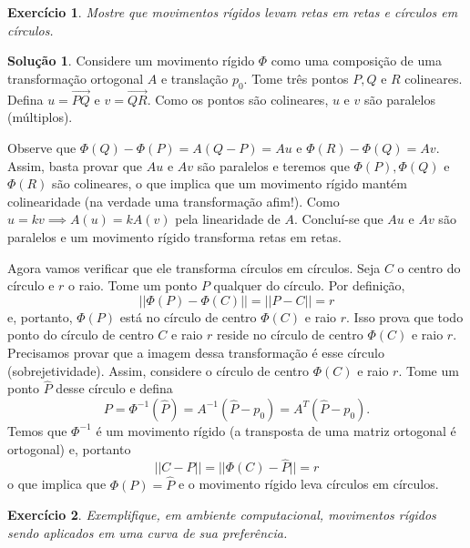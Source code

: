 \documentclass[a4paper,12pt]{article}
\theoremstyle{exer}
\newtheorem{exercise}{Exercício}
\theoremstyle{definition}
\newtheorem{solution}{Solução}
\theoremstyle{plain}
\begin{document}
\begin{exercise}
    Mostre que movimentos rígidos levam retas em retas e círculos em círculos.
\end{exercise}

\begin{solution}
    Considere um movimento rígido $\Phi$ como uma composição de uma transformação
    ortogonal $A$ e translação $p_0$. Tome três pontos $P, Q$ e $R$
    colineares. Defina $u = \vec{PQ}$ e $v = \vec{QR}$.  Como os pontos são
    colineares, $u$ e $v$ são paralelos (múltiplos). 
    
    Observe que $\Phi(Q) - \Phi(P) = A(Q - P) = Au$ e $\Phi(R) - \Phi(Q) =
    Av$. Assim, basta provar que $Au$ e $Av$ são paralelos e teremos que $\Phi(P),
    \Phi(Q)$ e $\Phi(R)$ são colineares, o que implica que um movimento rígido
    mantém colinearidade (na verdade uma transformação afim!). Como $u = kv
    \implies A(u) = kA(v)$ pela linearidade de $A$.  Concluí-se que $Au$ e
    $Av$ são paralelos e um movimento rígido transforma retas em retas. 

    \vspace{5mm}

    \noindent Agora vamos verificar que ele transforma círculos em círculos. Seja $C$ o centro do círculo e $r$ o raio. Tome um ponto $P$ qualquer do círculo. Por definição, 
    $$
    ||\Phi(P) - \Phi(C)|| = ||P - C|| = r
    $$
    e, portanto, $\Phi(P)$ está no círculo de centro $\Phi(C)$ e raio $r$.
    Isso prova que todo ponto do círculo de centro $C$ e raio $r$ reside no
    círculo de centro $\Phi(C)$ e raio $r$. Precisamos provar que a imagem
    dessa transformação é esse círculo (sobrejetividade). Assim, considere o
    círculo de centro $\Phi(C)$ e raio $r$. Tome um ponto $\hat{P}$ desse círculo e defina 
    $$P = \Phi^{-1}(\hat{P}) = A^{-1}(\hat{P} - p_0) = A^T(\hat{P} - p_0).$$
    Temos que $\Phi^{-1}$ é um movimento rígido (a transposta de uma matriz
    ortogonal é ortogonal) e, portanto 
    $$
    ||C - P|| = ||\Phi(C) - \hat{P}|| = r
    $$
    o que implica que $\Phi(P) = \hat{P}$ e o movimento rígido leva círculos
    em círculos. 

\end{solution}

\begin{exercise}
    Exemplifique, em ambiente computacional, movimentos rígidos sendo
    aplicados em uma curva de sua preferência.
\end{exercise}
\end{document}
